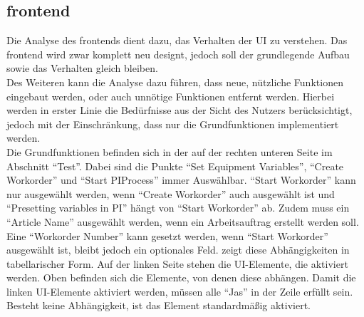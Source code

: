 \subsection{\texorpdfstring{\gls{frontend}}{Frontend}}
\glsenablehyper
Die Analyse des \glspl{frontend} dient dazu, das Verhalten der \gls{UI} zu verstehen. Das \gls{frontend} wird zwar komplett neu designt, jedoch soll der grundlegende Aufbau sowie das Verhalten gleich bleiben.\\
Des Weiteren kann die Analyse dazu führen, dass neue, nützliche Funktionen eingebaut werden, oder auch unnötige Funktionen entfernt werden. Hierbei werden in erster Linie die Bedürfnisse aus der Sicht des Nutzers berücksichtigt, jedoch mit der Einschränkung, dass nur die Grundfunktionen implementiert werden.\\
Die Grundfunktionen befinden sich in der  auf der rechten unteren Seite im Abschnitt \enquote{Test}. Dabei sind die Punkte \enquote{Set Equipment Variables}, \enquote{Create Workorder} und \enquote{Start PIProcess} immer Auswählbar. \enquote{Start Workorder} kann nur ausgewählt werden, wenn \enquote{Create Workorder} auch ausgewählt ist und \enquote{Presetting variables in PI} hängt von \enquote{Start Workorder} ab. Zudem muss ein \enquote{Article Name} ausgewählt werden, wenn ein Arbeitsauftrag erstellt werden soll. Eine \enquote{Workorder Number} kann gesetzt werden, wenn \enquote{Start Workorder} ausgewählt ist, bleibt jedoch ein optionales Feld.  zeigt diese Abhängigkeiten in tabellarischer Form. Auf der linken Seite stehen die \gls{UI}-Elemente, die aktiviert werden. Oben befinden sich die Elemente, von denen diese abhängen. Damit die linken \gls{UI}-Elemente aktiviert werden, müssen alle \enquote{Jas} in der Zeile erfüllt sein. Besteht keine Abhängigkeit, ist das Element standardmäßig aktiviert.

